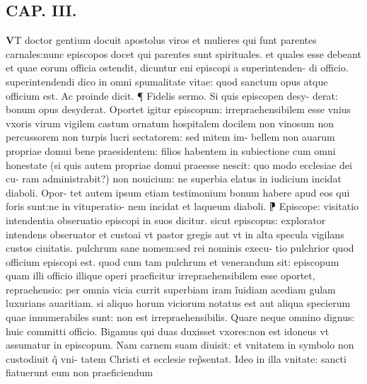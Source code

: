 \documentclass{article}
\begin{document}
\begin{pages}
\endnumbering\beginnumbering\section{CAP. III.}\pstart \huge\textbf{V}\normalsize T doctor gentium docuit apostolus viros et mulieres qui funt parentes carnales:nunc episcopos docet qui parentes sunt spirituales. et quales esse debeant et quae eorum officia ostendit, dicuntur eni episcopi a superintenden- di officio. superintendendi dico in omni spumalitate vitae: quod sanctum opus atque  officium est. Ac proinde dicit. ¶ Fidelis sermo. Si quis episcopen desy- derat: bonum opus desyderat. Oportet igitur episcopum: irrepraehensibilem esse  vnius vxoris virum  vigilem castum ornatum hospitalem docilem  non vinosum  non percussorem non turpis lucri sectatorem: sed mitem  im-    bellem  non auarum propriae domui bene praesidentem: filios habentem in subiectione cum   omni honestate (si quis autem propriae domui praeesse nescit: quo modo ecclesiae dei cu-   ram administrabit?) non nouicium: ne superbia elatus in iudicium incidat diaboli. Opor-   tet autem ipsum etiam testimonium bonum habere apud eos qui foris sunt:ne in vituperatio-   nem incidat et laqueum diaboli. ⁋ Episcope: visitatio  intendentia  obseruatio episcopi in suos dicitur. sicut episcopus: explorator intendens obseruator et custoai vt pastor gregis aut vt in alta specula vigilans custos ciuitatis. pulchrum sane nomem:sed rei nominis execu- tio pulchrior quod officium episcopi est. quod  cum tam pulchrum et venerandum sit: episcopum quam illi officio illique  operi praeficitur  irrepraehensibilem esse oportet, repraehensio: per omnia vicia currit superbiam iram  ĩuidiam  acediam  gulam luxurians auaritiam. si aliquo horum viciorum notatus est aut aliqua specierum quae innumerabiles sunt: non est irrepraehensibilis. Quare neque  omnino dignus: huic committi officio. Bigamus qui duas duxisset vxores:non est idoneus  vt assumatur in episcopum. Nam carnem suam diuisit: et vnitatem in symbolo non custodiuit  q̃ vni- tatem Christi et ecclesie rep̃sentat. Ideo in illa vnitate: sancti fiatuerunt eum non praeficiendum  \pend
\endnumbering
\end{pages}
\end{document}
